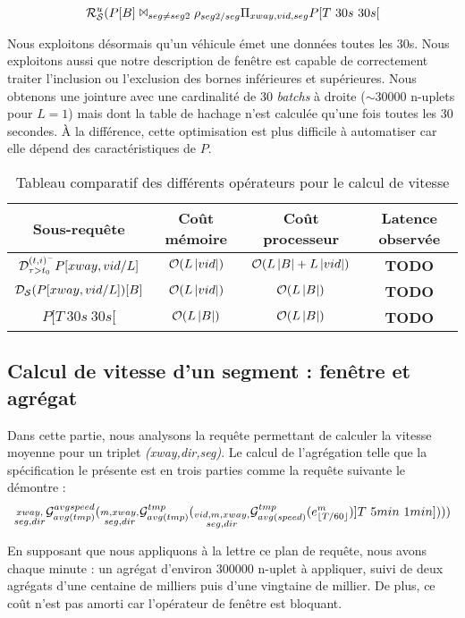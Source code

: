 $$\mathcal{R}_{\mathcal S}^{u}(P[B] \Join_{seg\neq seg2} \rho_{seg2/seg} \Pi_{xway,vid,seg} P[T\ 30s\ 30s[$$

Nous exploitons désormais qu'un véhicule émet une données toutes les 30s. Nous exploitons aussi que notre description de fenêtre est capable de correctement traiter l'inclusion ou l'exclusion des bornes inférieures et supérieures. Nous obtenons une jointure avec une cardinalité de 30 \textit{batchs} à droite ($\sim$30000 n-uplets pour $L=1$) mais dont la table de hachage n'est calculée qu'une fois toutes les 30 secondes. À la différence, cette optimisation est plus difficile à automatiser car elle dépend des caractéristiques de $P$.

\begin{table}[ht]
\centering
\begin{tabular}{|c|c|c|c|}\bottomrule
\rowcolor{hypcolor} Sous-requête & Coût mémoire & Coût processeur & Latence observée \\ \hline
$\mathcal{D}^{(t,i)^-}_{\tau>t_0} P[xway,vid/L]$ & $\mathcal{O}(L\left| vid \right|)$ & $\mathcal{O}(L\left| B \right|+L\left| vid \right|)$ & \textbf{TODO}\\\hline
$\mathcal{D_S}(P[xway,vid/L])[B]$ & $\mathcal O(L\left| vid \right|)$ & $\mathcal{O}(L\left| B \right|)$ & \textbf{TODO} \\\hline
$P[T\ 30s\ 30s[$ & $\mathcal O(L\left| B \right|)$ & $\mathcal{O}(L\left| B \right|)$ & \textbf{TODO} \\ \toprule
\end{tabular}
\caption{Tableau comparatif des différents opérateurs pour le calcul de vitesse}
\end{table}


\subsection{Calcul de vitesse d'un segment : fenêtre et agrégat}
Dans cette partie, nous analysons la requête permettant de calculer la vitesse moyenne pour un triplet \textit{(xway,dir,seg)}. Le calcul de l'agrégation telle que la spécification le présente est en trois parties comme la requête suivante le démontre :
$$\null_{\substack{xway,\\ seg,dir}}\G_{avg(tmp)}^{avgspeed}(\null_{\substack{m,xway,\\ seg,dir}}\G_{avg(tmp)}^{tmp}(\null_{\substack{vid,m,xway,\\ seg,dir}}\G_{avg(speed)}^{tmp} (e_{\lfloor T/60 \rfloor}^{m})]T\ 5min\ 1min])))$$

En supposant que nous appliquons à la lettre ce plan de requête, nous avons chaque minute : un agrégat d'environ 300000 n-uplet à appliquer, suivi de deux agrégats d'une centaine de milliers puis d'une vingtaine de millier. De plus, ce coût n'est pas amorti car l'opérateur de fenêtre est bloquant.

